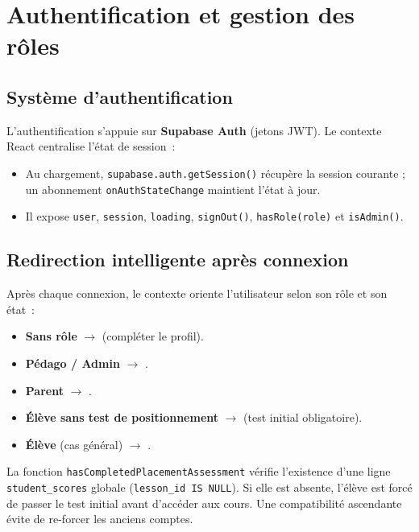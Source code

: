 \chapter{Authentification et gestion des rôles}

\section{Système d'authentification}
L'authentification s'appuie sur \textbf{Supabase Auth} (jetons JWT). Le contexte
React  centralise l'état de session~:
\begin{itemize}
  \item Au chargement, \texttt{supabase.auth.getSession()} récupère la session
        courante ; un abonnement \texttt{onAuthStateChange} maintient l'état à jour.
  \item Il expose \texttt{user}, \texttt{session}, \texttt{loading},
        \texttt{signOut()}, \texttt{hasRole(role)} et \texttt{isAdmin()}.
\end{itemize}

\section{Redirection intelligente après connexion}
Après chaque connexion, le contexte oriente l'utilisateur selon son rôle et son
état~:
\begin{itemize}
  \item \textbf{Sans rôle} $\rightarrow$  (compléter le profil).
  \item \textbf{Pédago / Admin} $\rightarrow$ .
  \item \textbf{Parent} $\rightarrow$ .
  \item \textbf{Élève sans test de positionnement} $\rightarrow$
         (test initial obligatoire).
  \item \textbf{Élève} (cas général) $\rightarrow$ .
\end{itemize}

\begin{infobox}
La fonction \texttt{hasCompletedPlacementAssessment} vérifie l'existence d'une
ligne \texttt{student\_scores} \og globale\fg{} (\texttt{lesson\_id IS NULL}). Si
elle est absente, l'élève est forcé de passer le test initial avant d'accéder
aux cours. Une compatibilité ascendante évite de re-forcer les anciens comptes.
\end{infobox}

